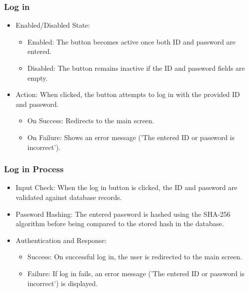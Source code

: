 \documentclass[conference]{IEEEtran}
\begin{document}
\subsubsection{Log in}
\begin{itemize}
    \item Enabled/Disabled State:
\begin{itemize}
    \item Enabled: The button becomes active once both ID and password are entered.\\
    \item Disabled: The button remains inactive if the ID and password fields are empty.\\
\end{itemize}
\end{itemize}
\begin{itemize}
    \item Action: When clicked, the button attempts to log in with the provided ID and password.
\begin{itemize}
    \item On Success: Redirects to the main screen.\\
    \item On Failure: Shows an error message ('The entered ID or password is incorrect').\\
\end{itemize}
\end{itemize}


\subsubsection{Log in Process}
\begin{itemize}
    \item Input Check: When the log in button is clicked, the ID and password are validated against database records.\\
    \item Password Hashing: The entered password is hashed using the SHA-256 algorithm before being compared to the stored hash in the database.\\
    \item Authentication and Response:
\begin{itemize}
    \item Success: On successful log in, the user is redirected to the main screen.\\
    \item Failure: If log in fails, an error message ('The entered ID or password is incorrect') is displayed.\\
\end{itemize}
\end{itemize}
\end{document}
